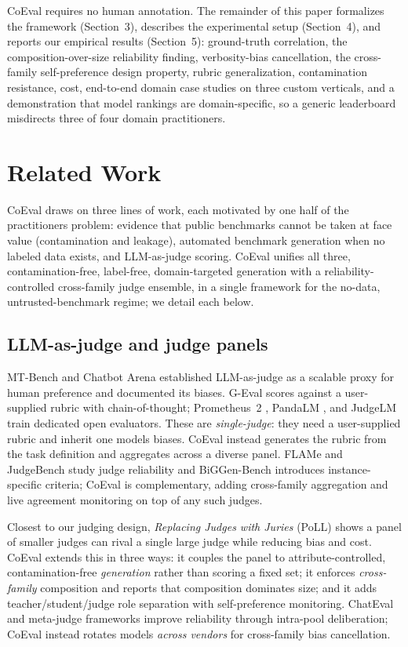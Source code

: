 CoEval requires no human annotation. The remainder of this paper formalizes the framework (Section~3), describes the experimental
setup (Section~4), and reports our empirical results (Section~5): ground-truth correlation, the
composition-over-size reliability finding, verbosity-bias cancellation, the cross-family self-preference design
property, rubric generalization, contamination resistance, cost, end-to-end domain case studies on three custom verticals, and a demonstration that model rankings are domain-specific, so a generic leaderboard misdirects three of four domain practitioners.

\section{Related Work}\label{related-work}

CoEval draws on three lines of work, each motivated by one half of the practitioner\textquotesingle s problem: evidence that public
benchmarks cannot be taken at face value (contamination and leakage), automated benchmark generation when no labeled
data exists, and LLM-as-judge scoring. CoEval unifies all three, contamination-free, label-free, domain-targeted
generation with a reliability-controlled cross-family judge ensemble, in a single framework for the no-data,
untrusted-benchmark regime; we detail each below.

\subsection{LLM-as-judge and judge panels}\label{llm-as-judge-and-judge-panels}

MT-Bench and Chatbot Arena \citep{ref1} established LLM-as-judge as a scalable proxy for human preference and
documented its biases. G-Eval \citep{ref2} scores against a user-supplied rubric with chain-of-thought;
Prometheus~2 \citep{ref3}, PandaLM \citep{ref34}, and JudgeLM \citep{ref35} train
dedicated open evaluators. These are \emph{single-judge}: they need a user-supplied rubric and inherit one model\textquotesingle s
biases. CoEval instead generates the rubric from the task definition and aggregates across a diverse panel. FLAMe
\citep{ref4} and JudgeBench \citep{ref6} study judge reliability and BiGGen-Bench
\citep{ref7} introduces instance-specific criteria; CoEval is complementary, adding cross-family aggregation
and live agreement monitoring on top of any such judges.

Closest to our judging design, \emph{Replacing Judges with Juries} (PoLL) \citep{ref5} shows a panel of
smaller judges can rival a single large judge while reducing bias and cost. CoEval extends this in three ways: it
couples the panel to attribute-controlled, contamination-free \emph{generation} rather than scoring a fixed set; it
enforces \emph{cross-family} composition and reports that composition dominates size; and it adds teacher/student/judge
role separation with self-preference monitoring. ChatEval \citep{ref21} and meta-judge frameworks
\citep{ref26} improve reliability through intra-pool deliberation; CoEval instead rotates models
\emph{across vendors} for cross-family bias cancellation.

